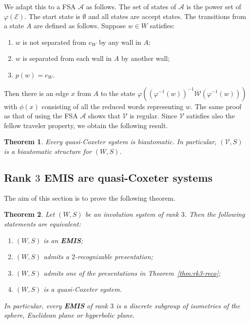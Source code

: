 \documentclass[A4paper, oneside]{amsart}
\newcommand{\id}{\textit{e}}
\newcommand{\W}{\mathcal{W}}
\newcommand{\A}{\mathcal{A}}
\newcommand{\V}{\mathcal{V}}
\newcommand{\EMIS}{\textnormal{\bf EMIS}\xspace}
\newtheorem{thm}{Theorem}[section]
\theoremstyle{definition}
\begin{document}
 We adapt this to a FSA $\A$ as follows. The set of states of $\A$ is the power set of $\varphi(\mathcal{E})$. The start state is $\emptyset$ and all states are accept states. The transitions from a state $A$ are defined as follows. Suppose $w \in W$ satisfies:
 \begin{enumerate}
 	\item \label{FSA1-quasi} $w$ is not separated from $\id_W$ by any wall in $A$;
 	
 	\item \label{FSA2-quasi} $w$ is separated from each wall in $A$ by another wall;
 	
 	\item \label{FSA3-quasi} $p(w) = \id_W$.
 \end{enumerate}
 Then there is an edge $x$ from $A$ to the state $\varphi((\varphi^{-1}(w))^{-1}\overline{\W}(\varphi^{-1}(w)))$ with $\phi(x)$ consisting of all the reduced words representing $w$. The same proof as that of \cite[Proposition 6.1]{OP22} using the FSA $\A$ shows that $\V$ is regular. Since $\V$ satisfies also the fellow traveler property, we obtain the following result.

\begin{thm}
\label{thm:Automatic}
	Every quasi-Coxeter system is biautomatic. In particular, $(\V, S)$ is a biautomatic structure for $(W,S)$.
\end{thm}


\subsection{Rank $3$ \EMIS are quasi-Coxeter systems} \label{ss: rank 3 EMIS} The aim of this section is to prove the following theorem. 

\begin{thm} \label{rank3-theorem}
    Let $(W,S)$ be an involution system of rank $3$. Then the following statements are equivalent:
    \begin{enumerate}
     \item $(W,S)$ is an \EMIS; \label{rank3-theorem-1}
     \item $(W,S)$ admits a $2$-recognizable presentation; \label{rank3-theorem-2}
     \item $(W,S)$ admits one of the presentations in Theorem~\ref{thm:rk3-reco}; \label{rank3-theorem-3}
     \item \label{rank3-theorem-4} $(W,S)$ is a quasi-Coxeter system.
     \end{enumerate}
     In particular, every \EMIS of rank $3$ is a discrete subgroup of isometries of the sphere, Euclidean plane or hyperbolic plane.
\end{thm}
\end{document}
